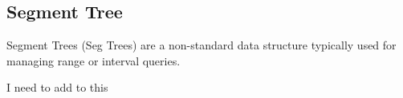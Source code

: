 \subsection*{Segment Tree}

Segment Trees (Seg Trees) are a non-standard data structure typically used for managing range or interval queries.

I need to add to this